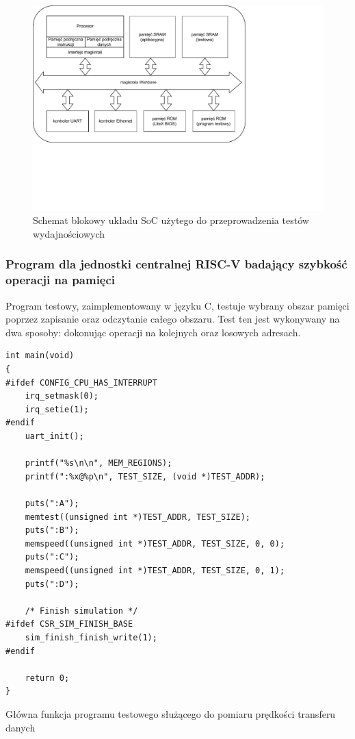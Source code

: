 \begin{figure}[H]
	\centering
	\includegraphics[scale=1,trim={0 4.9cm 5.6cm 0},clip]{testing/benchmark-soc-diag.pdf}
	\caption{Schemat blokowy układu SoC użytego do przeprowadzenia testów wydajnościowych}
	\label{fig:benchmark-soc-diag}
\end{figure}

\subsubsection{Program dla jednostki centralnej RISC-V badający szybkość operacji na pamięci}

Program testowy, zaimplementowany w języku C, testuje wybrany obszar pamięci poprzez zapisanie oraz odczytanie całego obszaru. Test ten jest wykonywany na dwa sposoby: dokonując operacji na kolejnych oraz losowych adresach.

\begin{listing}[H]
\begin{verbatim}
int main(void)
{
#ifdef CONFIG_CPU_HAS_INTERRUPT
    irq_setmask(0);
    irq_setie(1);
#endif
    uart_init();

    printf("%s\n\n", MEM_REGIONS);
    printf(":%x@%p\n", TEST_SIZE, (void *)TEST_ADDR);

    puts(":A");
    memtest((unsigned int *)TEST_ADDR, TEST_SIZE);
    puts(":B");
    memspeed((unsigned int *)TEST_ADDR, TEST_SIZE, 0, 0);
    puts(":C");
    memspeed((unsigned int *)TEST_ADDR, TEST_SIZE, 0, 1);
    puts(":D");

    /* Finish simulation */
#ifdef CSR_SIM_FINISH_BASE
    sim_finish_finish_write(1);
#endif

    return 0;
}
\end{verbatim}
\caption{\label{lst:benchmark-main.c}Główna funkcja programu testowego służącego do pomiaru prędkości transferu danych}
\end{listing}

